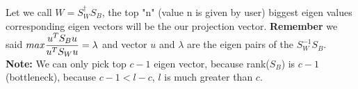 \documentclass{article}
\begin{document}
Let we call $W = S_W^\dagger S_B$, the top "n" (value n is given by user) biggest eigen values corresponding eigen vectors will be the our projection vector. {\bfseries{Remember}} we said $\mathlarger{max \frac{u^T S_B u}{u^T S_W u}} = \lambda$ and vector $u$ and $\lambda$ are the eigen pairs of the $S_W^{-1} S_B$. {\bfseries{Note:}} We can only pick top $c-1$ eigen vector, because  rank($S_B$) is $c-1$ (bottleneck), because $c-1 < l-c$, $l$ is much greater than $c$.
\end{document}
